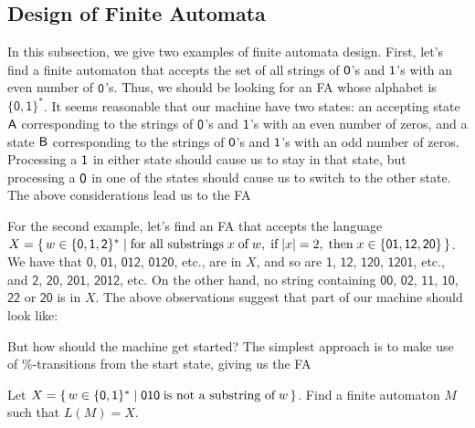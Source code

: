 \subsection{Design of Finite Automata}

In this subsection, we give two examples of finite automata
design.  First, let's find a finite automaton that accepts the set
of all strings of $\mathsf{0}$'s and $\mathsf{1}$'s with an even number of
$\mathsf{0}$'s.  Thus, we should be looking for an FA whose alphabet is
$\{\mathsf{0,1}\}^*$.  It seems reasonable that our machine have two
states: an accepting state $\mathsf{A}$ corresponding to the strings of
$\mathsf{0}$'s and $\mathsf{1}$'s with an even number of zeros, and a state
$\mathsf{B}$ corresponding to the strings of $\mathsf{0}$'s and $\mathsf{1}$'s with
an odd number of zeros.  Processing a $\mathsf{1}$ in either state should
cause us to stay in that state, but processing a $\mathsf{0}$ in one of
the states should cause us to switch to the other state.  The above
considerations lead us to the FA
\begin{center}

\end{center}

For the second example, let's find an FA that accepts the language
$X=\{ \, w\in\mathsf{\{0,1,2\}^*} \mid \allowbreak\mbox{for all substrings}\allowbreak\;x
  \;\allowbreak\mbox{of}\allowbreak\;w,\;\allowbreak\mbox{if}\allowbreak\;|x|=2,\;\allowbreak\mbox{then}\allowbreak\;x\in\{\mathsf{01,12,20}\} \, \}$.
We have that $\mathsf{0}$, $\mathsf{01}$, $\mathsf{012}$,
$\mathsf{0120}$, etc., are in $X$, and so are $\mathsf{1}$,
$\mathsf{12}$, $\mathsf{120}$, $\mathsf{1201}$, etc., and
$\mathsf{2}$, $\mathsf{20}$, $\mathsf{201}$, $\mathsf{2012}$, etc.  On
the other hand, no string containing $\mathsf{00}$, $\mathsf{02}$,
$\mathsf{11}$, $\mathsf{10}$, $\mathsf{22}$ or $\mathsf{20}$ is in
$X$.  The above observations suggest that part of our machine should
look like:
\begin{center}

\end{center}
But how should the machine get started?  The simplest approach is to
make use of $\%$-transitions from the start state, giving us
the FA
\begin{center}

\end{center}

\begin{exercise}
Let $X=\{ \, w\in\{\mathsf{0,1}\}^* \mid \mathsf{010}\;\allowbreak\mbox{is not a
    substring of}\allowbreak\;w \, \}$.  Find a finite automaton $M$ such that $L(M)=X$.
\end{exercise}

